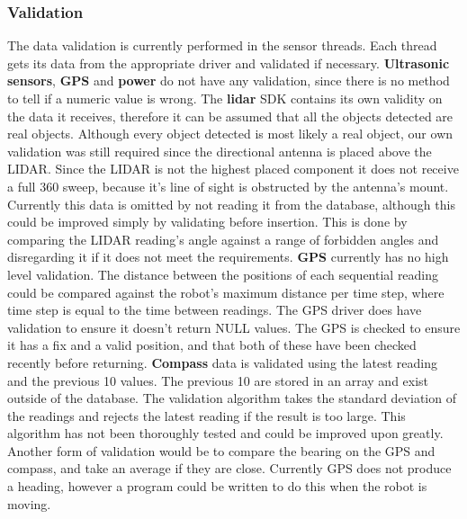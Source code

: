 \subsubsection{Validation}
The data validation is currently performed in the sensor threads. Each thread gets its data from the appropriate driver and validated if necessary.
\newline
\newline
\textbf{Ultrasonic sensors}, \textbf{GPS} and \textbf{power} do not have any validation, since there is no method to tell if a numeric value is wrong.
\newline
\newline
The \textbf{lidar} SDK contains its own validity on the data it receives, therefore it can be assumed that all the objects detected are real objects. Although every object detected is most likely a real object, our own validation was still required since the directional antenna is placed above the LIDAR. Since the LIDAR is not the highest placed component it does not receive a full 360 \degree sweep, because it's line of sight is obstructed by the antenna's mount. Currently this data is omitted by not reading it from the database, although this could be improved simply by validating before insertion.  This is done by comparing the LIDAR reading's angle against a range of forbidden angles and disregarding it if it does not meet the requirements.
\newline
\newline
\textbf{GPS} currently has no high level validation. The distance between the positions of each sequential reading could be compared against the robot's maximum distance per time step, where time step is equal to the time between readings. 
The GPS driver does have validation to ensure it doesn't return NULL values. The GPS is checked to ensure it has a fix and a valid position, and that both of these have been checked recently before returning.
\newline
\textbf{Compass} data is validated using the latest reading and the previous 10 values. The previous 10 are stored in an array and exist outside of the database. The validation algorithm takes the standard deviation of the readings and rejects the latest reading if the result is too large. This algorithm has not been thoroughly tested and could be improved upon greatly. Another form of validation would be to compare the bearing on the GPS and compass, and take an average if they are close. Currently GPS does not produce a heading, however a program could be written to do this when the robot is moving.

